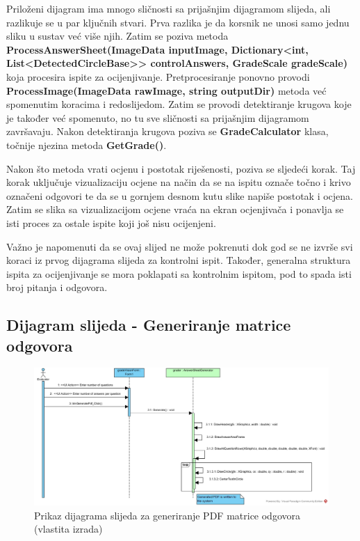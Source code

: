 \documentclass{foi}
\begin{document}
Priloženi dijagram ima mnogo sličnosti sa prijašnjim dijagramom slijeda, ali razlikuje se u par ključnih stvari. Prva razlika je da korsnik ne unosi samo jednu sliku u sustav već više njih. Zatim se poziva metoda \textbf{ProcessAnswerSheet(ImageData inputImage, Dictionary<int, List<DetectedCircleBase>> controlAnswers, GradeScale gradeScale)} koja procesira ispite za ocijenjivanje. Pretprocesiranje ponovno provodi \textbf{ProcessImage(ImageData rawImage, string outputDir)} metoda već spomenutim koracima i redoslijedom. Zatim se provodi detektiranje krugova koje je također već spomenuto, no tu sve sličnosti sa prijašnjim dijagramom završavaju. Nakon detektiranja krugova poziva se \textbf{GradeCalculator} klasa, točnije njezina metoda \textbf{GetGrade()}.

Nakon što metoda vrati ocjenu i postotak riješenosti, poziva se sljedeći korak. Taj korak uključuje vizualizaciju ocjene na način da se na ispitu označe točno i krivo označeni odgovori te da se u gornjem desnom kutu slike napiše postotak i ocjena. Zatim se slika sa vizualizacijom ocjene vraća na ekran ocjenjivača i ponavlja se isti proces za ostale ispite koji još nisu ocijenjeni.

Važno je napomenuti da se ovaj slijed ne može pokrenuti dok god se ne izvrše svi koraci iz prvog dijagrama slijeda za kontrolni ispit. Također, generalna struktura ispita za ocijenjivanje se mora poklapati sa kontrolnim ispitom, pod to spada isti broj pitanja i odgovora.

\subsection{Dijagram slijeda - Generiranje matrice odgovora}

\begin{figure}[H]
\centering
\includegraphics[width=1.0\linewidth]{slike/sequence3.jpg}
\caption{Prikaz dijagrama slijeda za generiranje PDF matrice odgovora (vlastita izrada)}
\end{figure}
\end{document}
